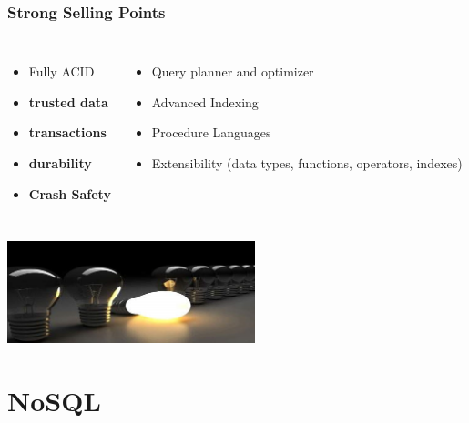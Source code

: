 \documentclass{beamer}
\begin{document}
\begin{frame}[fragile]
  \frametitle{Strong Selling Points}

  \vfill

\begin{columns}[c]

  \begin{itemize}
  \item Fully ACID
  \item \textbf{trusted data}
  \item \textbf{transactions}
  \item \textbf{durability}
  \item \textbf{Crash Safety}
  \end{itemize}


  \begin{itemize}
  \item Query planner and optimizer
  \item Advanced Indexing
  \item Procedure Languages
  \item Extensibility (data types, functions, operators, indexes)
  \end{itemize}
\end{columns}

\vfill

\begin{center}
  \includegraphics[height=8em]{disruptive-innovationn.jpg}
\end{center}
\end{frame}

\section{NoSQL}
\end{document}
